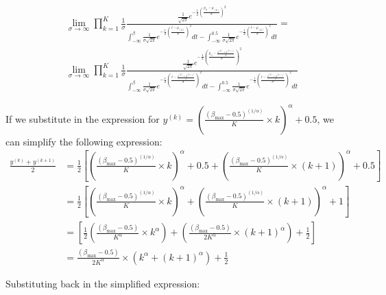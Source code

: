 \documentclass[11pt]{amsart}
\begin{document}
\begin{align}
&\lim_{\sigma \rightarrow \infty} \prod_{k=1}^K \frac{1}{\sigma} \frac{\frac{1}{\sqrt{2\pi}} e^{-\frac{1}{2}\left(\frac{p_{ij} - \mu_{(k)}}{\sigma}\right)^2}}{\int_{-\infty}^\beta \frac{1}{\sigma\sqrt{2\pi}} e^{-\frac{1}{2}\left(\frac{t- \mu_{(k)}}{\sigma}\right)^2 }dt -\int_{-\infty}^{0.5} \frac{1}{\sigma\sqrt{2\pi}} e^{-\frac{1}{2}\left(\frac{t- \mu_{(k)}}{\sigma}\right)^2 }dt} = \\
&\lim_{\sigma \rightarrow \infty}  \prod_{k=1}^K  \frac{1}{\sigma} \frac{\frac{1}{\sqrt{2\pi}} e^{-\frac{1}{2}\left(\frac{p_{ij} -  \frac{y^{(k)}+y^{(k+1)}}{2}}{\sigma}\right)^2}}{\int_{-\infty}^\beta \frac{1}{\sigma\sqrt{2\pi}} e^{-\frac{1}{2}\left(\frac{t-  \frac{y^{(k)}+y^{(k+1)}}{2}}{\sigma}\right)^2 }dt -\int_{-\infty}^{0.5} \frac{1}{\sigma\sqrt{2\pi}} e^{-\frac{1}{2}\left(\frac{t-  \frac{y^{(k)}+y^{(k+1)}}{2}}{\sigma}\right)^2 }dt} 
\end{align}


If we substitute in the expression for $y^{(k)} = \left( \frac{(\beta_{\max} - 0.5)^{(1/\alpha)}}{K} \times k \right)^\alpha + 0.5$, we can simplify the following expression:
\begin{align}
\frac{y^{(k)} + y^{(k+1)}}{2} &= \frac{1}{2} \left[ \left( \frac{(\beta_{\max} - 0.5)^{(1/\alpha)}}{K} \times k \right)^\alpha + 0.5 + \left( \frac{(\beta_{\max} - 0.5)^{(1/\alpha)}}{K} \times (k+1) \right)^\alpha + 0.5 \right] \\
&= \frac{1}{2} \left[ \left( \frac{(\beta_{\max} - 0.5)^{(1/\alpha)}}{K} \times k \right)^\alpha  +\left( \frac{(\beta_{\max} - 0.5)^{(1/\alpha)}}{K} \times (k+1) \right)^\alpha + 1 \right] \\
&=\left[\frac{1}{2} \left( \frac{(\beta_{\max} - 0.5)}{K^{\alpha}} \times k^{\alpha} \right)  +\left( \frac{(\beta_{\max} - 0.5)}{2K^{\alpha}} \times (k+1)^{\alpha} \right) + \frac{1}{2} \right] \\
&=  \frac{(\beta_{\max} - 0.5)}{2K^{\alpha}} \times  \left(  k^{\alpha} + (k+1)^{\alpha} \right) +\frac{1}{2} 
\end{align}

Substituting back in the simplified expression:
\end{document}
